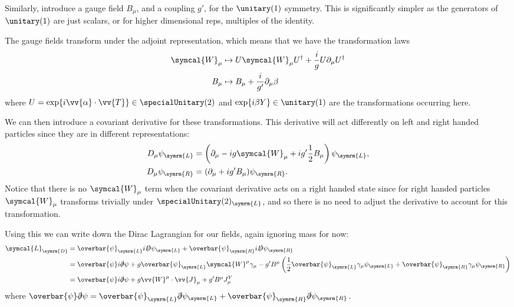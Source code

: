 \documentclass[fleqn]{NotesClass}
\newcommand{\diracadjoint}[1]{\overbar{#1}}
\newcommand{\covariantDerivative}{D}
\newcommand{\hermit}{\dagger}
\newcommand{\lagrangianDensity}{\symcal{L}}
\newcommand{\Left}{\symrm{L}}
\newcommand{\Right}{\symrm{R}}
\newcommand{\gaugeW}{\symcal{W}}
\begin{document}
    Similarly, introduce a gauge field \(B_\mu\), and a coupling \(g'\), for the \(\unitary(1)\) symmetry.
    This is significantly simpler as the generators of \(\unitary(1)\) are just scalars, or for higher dimensional reps, multiples of the identity.
    
    The gauge fields transform under the adjoint representation, which means that we have the transformation laws
    \begin{align}
        \gaugeW_\mu &\mapsto U \gaugeW_\mu U^\hermit + \frac{i}{g} U\partial_\mu U^\hermit\\
        B_\mu &\mapsto B_\mu + \frac{i}{g'} \partial_\mu \beta
    \end{align}
    where \(U = \exp\{i\vv{\alpha} \cdot \vv{T}\} \in \specialUnitary(2)\) and \(\exp\{i\beta Y\} \in \unitary(1)\) are the transformations occurring here.
    
    We can then introduce a covariant derivative for these transformations.
    This derivative will act differently on left and right handed particles since they are in different representations:
    \begin{align}
        \covariantDerivative_\mu \psi_{\Left} &= \left( \partial_\mu - ig\gaugeW_\mu + ig' \frac{1}{2}B_\mu \right) \psi_{\Left},\\
        \covariantDerivative_\mu \psi_{\Right} &= (\partial_\mu + ig' B_\mu)\psi_{\Right}.
    \end{align}
    Notice that there is no \(\gaugeW_\mu\) term when the covariant derivative acts on a right handed state since for right handed particles \(\gaugeW_\mu\) transforms trivially under \(\specialUnitary(2)_{\Left}\), and so there is no need to adjust the derivative to account for this transformation.
    
    Using this we can write down the Dirac Lagrangian for our fields, again ignoring mass for now:
    \begin{align}
        \lagrangianDensity_{\symrm{D}} &= \diracadjoint{\psi}_{\Left} i\slashed{\covariantDerivative}\psi_{\Left} + \diracadjoint{\psi}_{\Right} i\slashed{\covariantDerivative} \psi_{\Right}\\
        &= \diracadjoint{\psi}i\slashed{\partial}\psi + g\diracadjoint{\psi}_{\Left}\gaugeW^\mu \gamma_\mu - g' B^\mu\left( \frac{1}{2}\diracadjoint{\psi}_{\Left} \gamma_\mu \psi_{\Left} + \diracadjoint{\psi}_{\Right} \gamma_\mu \psi_{\Right} \right)\\
        &= \diracadjoint{\psi}i\slashed{\partial}\psi + g\vv{W}^\mu \cdot \vv{J}_\mu + g' B^\mu J^Y_\mu
    \end{align}
    where \(\diracadjoint{\psi}\slashed{\partial}\psi = \diracadjoint{\psi}_{\Left}\slashed{\partial}\psi_{\Left} + \diracadjoint{\psi}_{\Right}\slashed{\partial}\psi_{\Right}\).
    
\end{document}
